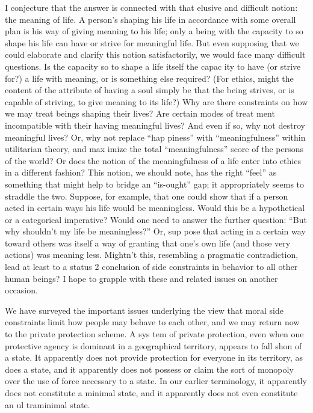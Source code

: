 \documentclass[11pt,openany]{book}
\begin{document}
I conjecture that the answer is connected with that elusive and difficult notion: the meaning of life. A person's shaping his life in accordance with some overall plan is his way of giving meaning to his life; only a being with the capacity to so shape his life can have or strive for meaningful life. But even supposing that we could elaborate and clarify this notion satisfactorily, we would face many difficult questions. Is the capacity so to shape a life itself the capac ity to have (or strive for?) a life with meaning, or is something else required? (For ethics, might the content of the attribute of having a soul simply be that the being strives, or is capable of striving, to give meaning to its life?) Why are there constraints on how we may treat beings shaping their lives? Are certain modes of treat ment incompatible with their having meaningful lives? And even if so, why not destroy meaningful lives? Or, why not replace ``hap piness'' with ``meaningfulness'' within utilitarian theory, and max imize the total ``meaningfulness'' score of the persons of the world? Or does the notion of the meaningfulness of a life enter into ethics in a different fashion? This notion, we should note, has the right ``feel'' as something that might help to bridge an ``is-ought'' gap; it appropriately seems to straddle the two. Suppose, for example, that one could show that if a person acted in certain ways his life would be meaningless. Would this be a hypothetical or a categorical imperative? Would one need to answer the further question: ``But why shouldn't my life be meaningless?'' Or, sup pose that acting in a certain way toward others was itself a way of granting that one's own life (and those very actions) was meaning less. Mightn't this, resembling a pragmatic contradiction, lead at least to a status 2 conclusion of side constraints in behavior to all other human beings? I hope to grapple with these and related issues on another occasion. 

We have surveyed the important issues underlying the view that moral side constraints limit how people may behave to each other, and we may return now to the private protection scheme. A sys tem of private protection, even when one protective agency is dominant in a geographical territory, appears to fall shon of a state. It apparently does not provide protection for everyone in its territory, as does a state, and it apparently does not possess or claim the sort of monopoly over the use of force necessary to a state. In our earlier terminology, it apparently does not constitute a minimal state, and it apparently does not even constitute an ul traminimal state. 
\end{document}
